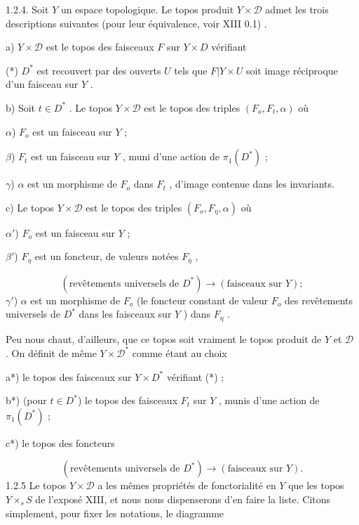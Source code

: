 1.2.4. Soit $Y$ un espace topologique. Le topos produit $Y \times \mathcal{D}$ admet les trois descriptions suivantes (pour leur équivalence, voir XIII 0.1) .

a) $Y \times \mathcal{D}$ est le topos des faisceaux $F$ sur $Y \times D$ vérifiant

(*) $D^*$ est recouvert par des ouverts $U$ tels que $F | Y \times U$ soit image réciproque d'un faisceau sur $Y$ .

b) Soit $t \in D^*$ . Le topos $Y \times \mathcal{D}$ est le topos des triples $(F_o, F_t, \alpha)$ où

$\alpha$) $F_o$ est un faisceau sur $Y$ ;

$\beta$) $F_t$ est un faisceau sur $Y$ , muni d'une action de $\pi_1(D^*)$ ;

$\gamma$) $\alpha$ est un morphisme de $F_o$ dans $F_t$ , d'image contenue dans les invariants.

c) Le topos $Y \times \mathcal{D}$ est le topos des triples $(F_o, F_\eta, \alpha)$ où

$\alpha'$) $F_o$ est un faisceau sur $Y$ ;

$\beta'$) $F_\eta$ est un foncteur, de valeurs notées $F_{\bar\eta}$ ,

\begin{equation*}
(\text{revêtements universels de } D^*) \longrightarrow (\text{faisceaux sur } Y ) ;
\end{equation*}
$\gamma'$) $\alpha$ est un morphisme de $F_o$ (le foncteur constant de valeur $F_o$ des revêtements universels de $D^*$ dans les faisceaux sur $Y$ ) dans $F_\eta$ .

Peu nous chaut, d'ailleurs, que ce topos soit vraiment le topos produit de $Y$ et $\mathcal{D}$ . On définit de même $Y \times \mathcal{D}^*$ comme étant au choix

a*) le topos des faisceaux sur $Y \times D^*$ vérifiant (*) ;

b*) (pour $t \in D^*$) le topos des faisceaux $F_t$ sur $Y$ , munis d'une action de $\pi_1(D^*)$ ;

c*) le topos des foncteurs

\begin{equation*}
(\text{revêtements universels de } D^*) \longrightarrow (\text{faisceaux sur } Y ).
\end{equation*}
1.2.5 Le topos $Y \times \mathcal{D}$ a les mêmes propriétés de fonctorialité en $Y$ que les topos $Y \times_s S$ de l'exposé XIII, et nous nous dispenserons d'en faire la liste. Citons simplement, pour fixer les notations, le diagramme 



